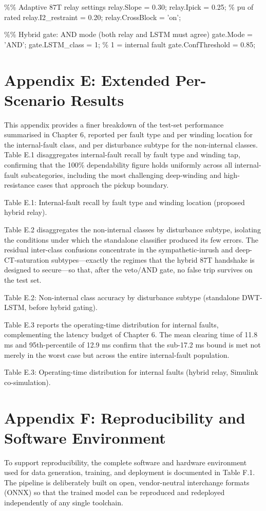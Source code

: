 \%\% Adaptive 87T relay settings
relay.Slope = 0.30; relay.Ipick = 0.25;      \% pu of rated
relay.I2\_restraint = 0.20; relay.CrossBlock = 'on';

\%\% Hybrid gate: AND mode (both relay and LSTM must agree)
gate.Mode = 'AND'; gate.LSTM\_class = 1;       \% 1 = internal fault
gate.ConfThreshold = 0.85;


\section{Appendix E: Extended Per-Scenario Results}
This appendix provides a finer breakdown of the test-set performance summarised in Chapter 6, reported per fault type and per winding location for the internal-fault class, and per disturbance subtype for the non-internal classes. Table E.1 disaggregates internal-fault recall by fault type and winding tap, confirming that the 100\% dependability figure holds uniformly across all internal-fault subcategories, including the most challenging deep-winding and high-resistance cases that approach the pickup boundary.

Table E.1: Internal-fault recall by fault type and winding location (proposed hybrid relay).

Table E.2 disaggregates the non-internal classes by disturbance subtype, isolating the conditions under which the standalone classifier produced its few errors. The residual inter-class confusions concentrate in the sympathetic-inrush and deep-CT-saturation subtypes---exactly the regimes that the hybrid 87T handshake is designed to secure---so that, after the veto/AND gate, no false trip survives on the test set.

Table E.2: Non-internal class accuracy by disturbance subtype (standalone DWT-LSTM, before hybrid gating).

Table E.3 reports the operating-time distribution for internal faults, complementing the latency budget of Chapter 6. The mean clearing time of 11.8 ms and 95th-percentile of 12.9 ms confirm that the sub-17.2 ms bound is met not merely in the worst case but across the entire internal-fault population.

Table E.3: Operating-time distribution for internal faults (hybrid relay, Simulink co-simulation).


\section{Appendix F: Reproducibility and Software Environment}
To support reproducibility, the complete software and hardware environment used for data generation, training, and deployment is documented in Table F.1. The pipeline is deliberately built on open, vendor-neutral interchange formats (ONNX) so that the trained model can be reproduced and redeployed independently of any single toolchain.

